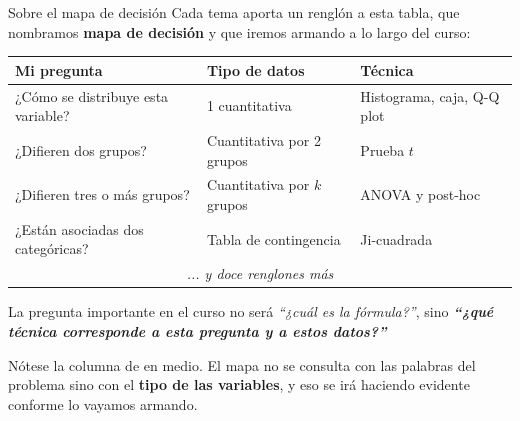 \documentclass[aspectratio=169,10pt]{beamer}
\newcommand{\destaca}[1]{%
  \par\vspace{3pt}\noindent
  \colorbox{azulClaro}{%
    \parbox{\dimexpr\linewidth-2\fboxsep\relax}{\vspace{3pt}#1\vspace{3pt}}}%
  \par\vspace{3pt}}
\begin{document}
\begin{frame}{Sobre el mapa de decisión}
  Cada tema aporta un renglón a esta tabla, que nombramos \textbf{mapa de decisión} y que iremos armando a lo largo del curso:
  
  \vspace{0.35cm}
  \centering
  {\small
  \begin{tabular}{@{}p{5.1cm}p{3.6cm}p{4.1cm}@{}}
    \toprule
    \textbf{Mi pregunta} & \textbf{Tipo de datos} & \textbf{Técnica} \\
    \midrule
    ¿Cómo se distribuye esta variable? & 1 cuantitativa & Histograma, caja, Q-Q plot \\
    ¿Difieren dos grupos? & Cuantitativa por 2 grupos & Prueba $t$ \\
    ¿Difieren tres o más grupos? & Cuantitativa por $k$ grupos & ANOVA y post-hoc \\
    ¿Están asociadas dos categóricas? & Tabla de contingencia & Ji-cuadrada \\
    \multicolumn{3}{c}{\textcolor{grisT}{\textit{... y doce renglones más}}} \\
    \bottomrule
  \end{tabular}}
  \vspace{0.5cm}
  \raggedright
  \destaca{La pregunta importante en el curso no será \textit{``¿cuál es la fórmula?''},
  sino \textbf{\textit{``¿qué técnica corresponde a esta pregunta y a estos datos?''}}

  \vspace{0.15cm}
  Nótese la columna de en medio. El mapa no se consulta con las palabras del problema
  sino con el \textbf{tipo de las variables}, y eso se irá haciendo evidente conforme lo
  vayamos armando.}
\end{frame}
\end{document}
